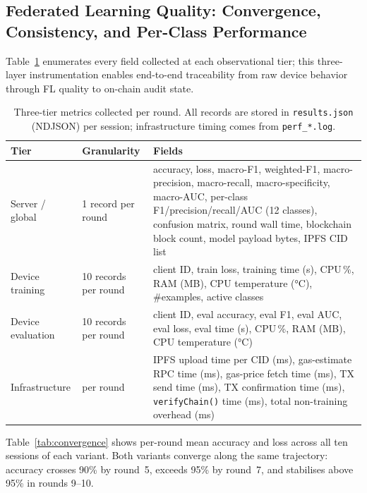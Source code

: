\documentclass{llncs}
\begin{document}
\subsection{Federated Learning Quality: Convergence, Consistency, and Per-Class Performance}
\label{subsec:flquality}

Table~\ref{tab:metrics} enumerates every field collected at each observational tier;
this three-layer instrumentation enables end-to-end traceability from raw
device behavior through FL quality to on-chain audit state.

\begin{table}[t]
\caption{Three-tier metrics collected per round. All records are stored in
  \texttt{results.json} (NDJSON) per session; infrastructure timing comes
  from \texttt{perf\_*.log}.}
\label{tab:metrics}
\centering\footnotesize
\setlength{\tabcolsep}{3pt}
\begin{tabular}{llp{6.3cm}}
\toprule
\textbf{Tier} & \textbf{Granularity} & \textbf{Fields} \\
\midrule
Server / global & 1 record per round
  & accuracy, loss, macro-F1, weighted-F1, macro-precision,
    macro-recall, macro-specificity, macro-AUC,
    per-class F1/precision/recall/AUC (12 classes),
    confusion matrix, round wall time, blockchain block count,
    model payload bytes, IPFS CID list \\
\midrule
Device training & 10 records per round
  & client ID, train loss, training time (s), CPU\,\%,
    RAM (MB), CPU temperature (°C), \#examples, active classes \\
\midrule
Device evaluation & 10 records per round
  & client ID, eval accuracy, eval F1, eval AUC, eval loss,
    eval time (s), CPU\,\%, RAM (MB), CPU temperature (°C) \\
\midrule
Infrastructure & per round
  & IPFS upload time per CID (ms), gas-estimate RPC time (ms),
    gas-price fetch time (ms), TX send time (ms),
    TX confirmation time (ms), \texttt{verifyChain()} time (ms),
    total non-training overhead (ms) \\
\bottomrule
\end{tabular}
\end{table}

Table~\ref{tab:convergence} shows per-round mean accuracy and loss across
all ten sessions of each variant. Both variants converge along the same
trajectory: accuracy crosses 90\% by round~5, exceeds 95\% by round~7,
and stabilises above 95\% in rounds 9--10.
\end{document}
